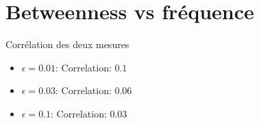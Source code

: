 \documentclass[aspectratio=169]{beamer}
\begin{document}
    \section{Betweenness vs fréquence}

    \begin{frame}{Corrélation des deux mesures}
    \begin{itemize}
        \item $\epsilon = 0.01$: Correlation: $0.1$
        \item $\epsilon = 0.03$: Correlation: $0.06$
        \item $\epsilon = 0.1$:  Correlation: $0.03$
    \end{itemize}
    \end{frame}

\end{document}
